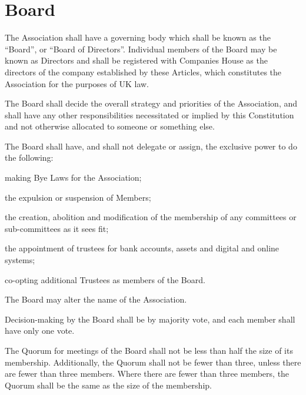 \documentclass[10pt]{mk-articles-of-association}
\newcommand{\EC}[0]{Board}
\newcommand{\Exec}[0]{\EC{} }
\begin{document}
\section{\Exec}
  \begin{constenum}

  \item The Association shall have a governing body which shall be
    known as the ``\EC{}'', or ``Board of Directors''. Individual
    members of the \Exec may be known as Directors and shall be
    registered with Companies House as the directors of the company
    established by these Articles, which constitutes the Association
    for the purposes of UK law.

  \item The \Exec shall decide the overall strategy and priorities of
    the Association, and shall have any other responsibilities
    necessitated or implied by this Constitution and not otherwise
    allocated to someone or something else.

  \item The \Exec shall have, and
    shall not delegate or assign, the exclusive power to do the
    following:\label{nondelegation}

    \begin{constenum}
      \item making Bye Laws for the Association;

      \item the expulsion or suspension of Members;

      \item the creation, abolition and modification of the membership of
        any committees or sub-committees as it sees fit;

      \item the appointment of trustees for bank accounts, assets and
        digital and online systems; \ITand

      \item co-opting additional Trustees as members of the \EC{}.

    \end{constenum}

  \item The \Exec may alter the name of the Association.

  \item Decision-making by the \Exec shall be by majority vote, and each
    member shall have only one vote.

  \item The Quorum for meetings of the \Exec shall not be less than
    half the size of its membership. Additionally, the Quorum shall
    not be fewer than three, unless there are fewer than three
    members. Where there are fewer than three members, the Quorum shall
    be the same as the size of the membership.


\end{constenum}
\end{document}
